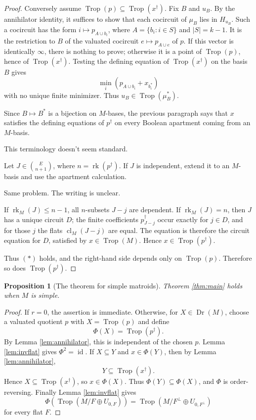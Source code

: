 \documentclass[12pt]{article}
\newtheorem{proposition}[theorem]{Proposition}
\theoremstyle{definition}
\newcommand{\Trop}{\operatorname{Trop}}
\newcommand{\Dr}{\operatorname{Dr}}
\newcommand{\rk}{\operatorname{rk}}
\newcommand{\cl}{\operatorname{cl}}
\newcommand{\binomE}[1]{\binom{E}{#1}}
\newcommand{\review}[1]{\begin{reviewbox}#1\end{reviewbox}}
\begin{document}
\begin{proof}
Conversely assume \(\Trop(p)\subseteq\Trop(x^\dagger)\).  Fix \(B\) and \(u_B\).  By the annihilator identity, it suffices to show that each cocircuit of \(\mu_B\) lies in \(H_{u_B}\).  Such a cocircuit has the form \(i\mapsto p_{A\cup b_i}\), where \(A=\{b_i:i\in S\}\) and \(|S|=k-1\).  It is the restriction to \(B\) of the valuated cocircuit \(e\mapsto p_{A\cup e}\) of \(p\).  If this vector is identically \(\infty\), there is nothing to prove; otherwise it is a point of \(\Trop(p)\), hence of \(\Trop(x^\dagger)\).  Testing the defining equation of \(\Trop(x^\dagger)\) on the basis \(B\) gives
\[
\min_i(p_{A\cup b_i}+x_{b_i^*})
\]
with no unique finite minimizer.  Thus \(u_B\in\Trop(\mu_B^*)\).

Since \(B\mapsto B^*\) is a bijection on \(M\)-bases, the previous paragraph says that \(x\) satisfies the defining equations of \(p^\dagger\) on every Boolean apartment coming from an \(M\)-basis. 
\review{This terminology doesn't seem standard.}
Let \(J\in\binomE{n+1}\), where \(n=\rk(p^\dagger)\).  If \(J\) is independent, extend it to an \(M\)-basis and use the apartment calculation. 
\review{Same problem. The writing is unclear.}
If \(\rk_M(J)\le n-1\), all \(n\)-subsets \(J-j\) are dependent.  If \(\rk_M(J)=n\), then \(J\) has a unique circuit \(D\); the finite coefficients \(p^\dagger_{J-j}\) occur exactly for \(j\in D\), and for those \(j\) the flats \(\cl_M(J-j)\) are equal.  The equation is therefore the circuit equation for \(D\), satisfied by \(x\in\Trop(M)\).  Hence \(x\in\Trop(p^\dagger)\).

Thus \((*)\) holds, and the right-hand side depends only on \(\Trop(p)\).  Therefore so does \(\Trop(p^\dagger)\).
\end{proof}

\begin{proposition}[The theorem for simple matroids]\label{prop:simple}
Theorem \ref{thm:main} holds when \(M\) is simple.
\end{proposition}

\begin{proof}
If \(r=0\), the assertion is immediate.  Otherwise, for \(X\in\Dr(M)\), choose a valuated quotient \(p\) with \(X=\Trop(p)\) and define
\[
\Phi(X)=\Trop(p^\dagger).
\]
By Lemma \ref{lem:annihilator}, this is independent of the chosen \(p\).  Lemma \ref{lem:invflat} gives \(\Phi^2=\operatorname{id}\).  If \(X\subseteq Y\) and \(x\in\Phi(Y)\), then by Lemma \ref{lem:annihilator},
\[
Y\subseteq\Trop(x^\dagger).
\]
Hence \(X\subseteq\Trop(x^\dagger)\), so \(x\in\Phi(X)\).  Thus \(\Phi(Y)\subseteq\Phi(X)\), and \(\Phi\) is order-reversing.  Finally Lemma \ref{lem:invflat} gives
\[
\Phi\!\left(\Trop(M/F\oplus U_{0,F})\right)
=
\Trop(M/F^\perp\oplus U_{0,F^\perp})
\]
for every flat \(F\).
\end{proof}
\end{document}
